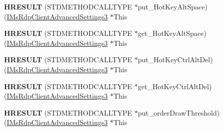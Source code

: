 \begin{DoxyCompactItemize}
\item 
\mbox{\label{struct_m_s_t_s_c_lib_1_1_i_ms_rdp_client_advanced_settings3_vtbl_a635f938d5bd70f137f96d2f51b2c8b1f}} 
{\bfseries H\+R\+E\+S\+U\+LT} (S\+T\+D\+M\+E\+T\+H\+O\+D\+C\+A\+L\+L\+T\+Y\+PE $\ast$put\+\_\+\+Hot\+Key\+Alt\+Space)(\hyperlink{interface_m_s_t_s_c_lib_1_1_i_ms_rdp_client_advanced_settings3}{I\+Ms\+Rdp\+Client\+Advanced\+Settings3} $\ast$This
\item 
\mbox{\label{struct_m_s_t_s_c_lib_1_1_i_ms_rdp_client_advanced_settings3_vtbl_a9b146efebbf2ae1a17cebbde547bccd1}} 
{\bfseries H\+R\+E\+S\+U\+LT} (S\+T\+D\+M\+E\+T\+H\+O\+D\+C\+A\+L\+L\+T\+Y\+PE $\ast$get\+\_\+\+Hot\+Key\+Alt\+Space)(\hyperlink{interface_m_s_t_s_c_lib_1_1_i_ms_rdp_client_advanced_settings3}{I\+Ms\+Rdp\+Client\+Advanced\+Settings3} $\ast$This
\item 
\mbox{\label{struct_m_s_t_s_c_lib_1_1_i_ms_rdp_client_advanced_settings3_vtbl_a3fdeb2b086f38dca89737f97aa6f2a87}} 
{\bfseries H\+R\+E\+S\+U\+LT} (S\+T\+D\+M\+E\+T\+H\+O\+D\+C\+A\+L\+L\+T\+Y\+PE $\ast$put\+\_\+\+Hot\+Key\+Ctrl\+Alt\+Del)(\hyperlink{interface_m_s_t_s_c_lib_1_1_i_ms_rdp_client_advanced_settings3}{I\+Ms\+Rdp\+Client\+Advanced\+Settings3} $\ast$This
\item 
\mbox{\label{struct_m_s_t_s_c_lib_1_1_i_ms_rdp_client_advanced_settings3_vtbl_a7ecc4e20bf3048c05537b1f9e19fcc5a}} 
{\bfseries H\+R\+E\+S\+U\+LT} (S\+T\+D\+M\+E\+T\+H\+O\+D\+C\+A\+L\+L\+T\+Y\+PE $\ast$get\+\_\+\+Hot\+Key\+Ctrl\+Alt\+Del)(\hyperlink{interface_m_s_t_s_c_lib_1_1_i_ms_rdp_client_advanced_settings3}{I\+Ms\+Rdp\+Client\+Advanced\+Settings3} $\ast$This
\item 
\mbox{\label{struct_m_s_t_s_c_lib_1_1_i_ms_rdp_client_advanced_settings3_vtbl_afbd20da282b1b75041abed96b6d27d1d}} 
{\bfseries H\+R\+E\+S\+U\+LT} (S\+T\+D\+M\+E\+T\+H\+O\+D\+C\+A\+L\+L\+T\+Y\+PE $\ast$put\+\_\+order\+Draw\+Threshold)(\hyperlink{interface_m_s_t_s_c_lib_1_1_i_ms_rdp_client_advanced_settings3}{I\+Ms\+Rdp\+Client\+Advanced\+Settings3} $\ast$This

\end{DoxyCompactItemize}
